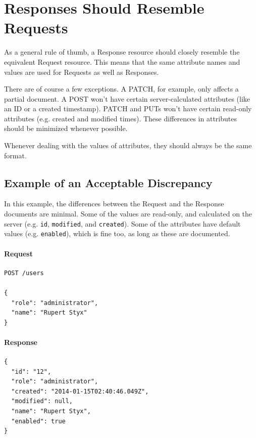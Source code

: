 \documentclass{book}
\begin{document}
\section{Responses Should Resemble Requests}

As a general rule of thumb, a Response resource should closely resemble the equivalent Request resource. This means that the same attribute names and values are used for Requests as well as Responses.

There are of course a few exceptions. A PATCH, for example, only affects a partial document. A POST won't have certain server-calculated attributes (like an ID or a created timestamp). PATCH and PUTs won't have certain read-only attributes (e.g. created and modified times). These differences in attributes should be minimized whenever possible.

Whenever dealing with the values of attributes, they should always be the same format.

\subsection{Example of an Acceptable Discrepancy}

In this example, the differences between the Request and the Response documents are minimal. Some of the values are read-only, and calculated on the server (e.g. \texttt{id}, \texttt{modified}, and \texttt{created}). Some of the attributes have default values (e.g. \texttt{enabled}), which is fine too, as long as these are documented.

\paragraph{\textbf{Request}}

\begin{verbatim}
POST /users

{
  "role": "administrator",
  "name": "Rupert Styx"
}
\end{verbatim}

\paragraph{\textbf{Response}}

\begin{verbatim}
{
  "id": "12",
  "role": "administrator",
  "created": "2014-01-15T02:40:46.049Z",
  "modified": null,
  "name": "Rupert Styx",
  "enabled": true
}
\end{verbatim}
\end{document}
